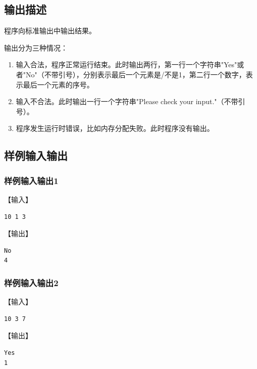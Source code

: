 \documentclass{article}
\begin{document}
\subsection{输出描述}

程序向标准输出中输出结果。

输出分为三种情况：

\begin{enumerate}
    \item 输入合法，程序正常运行结束。此时输出两行，第一行一个字符串"Yes"或者"No"（不带引号），分别表示最后一个元素是/不是1，第二行一个数字，表示最后一个元素的序号。
    \item 输入不合法。此时输出一行一个字符串"Please check your input."（不带引号）。
    \item 程序发生运行时错误，比如内存分配失败。此时程序没有输出。
\end{enumerate}

\subsection{样例输入输出}

\subsubsection{样例输入输出1}

【输入】

\begin{lstlisting}[language={bash},
    basicstyle=\small\menlo]
10 1 3
\end{lstlisting}

【输出】

\begin{lstlisting}[language={bash},
    basicstyle=\small\menlo]
No
4
\end{lstlisting}

\subsubsection{样例输入输出2}

【输入】

\begin{lstlisting}[language={bash},
    basicstyle=\small\menlo]
10 3 7
\end{lstlisting}

【输出】

\begin{lstlisting}[language={bash},
    basicstyle=\small\menlo]
Yes
1
\end{lstlisting}
\end{document}
